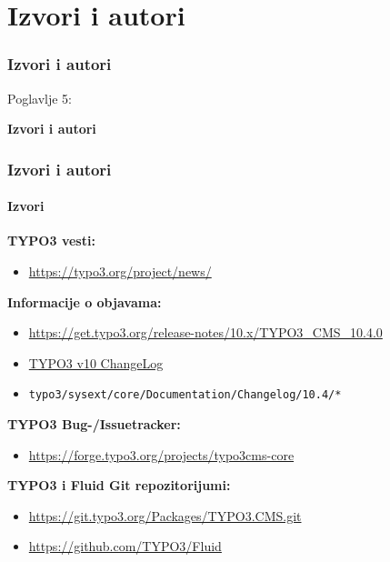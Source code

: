 %

\section{Izvori i autori}
\begin{frame}[fragile]
	\frametitle{Izvori i autori}

	\begin{center}\huge{Poglavlje 5:}\end{center}
	\begin{center}\huge{\color{typo3darkgrey}\textbf{Izvori i autori}}\end{center}

\end{frame}


\begin{frame}[fragile]
	\frametitle{Izvori i autori}
	\framesubtitle{Izvori}

	\textbf{TYPO3 vesti:}
		\begin{itemize}\smaller
			\item \url{https://typo3.org/project/news/}
		\end{itemize}

	\textbf{Informacije o objavama:}
		\begin{itemize}\smaller
			\item \url{https://get.typo3.org/release-notes/10.x/TYPO3_CMS_10.4.0}
			\item \href{https://docs.typo3.org/c/typo3/cms-core/master/en-us/Changelog-10.html}{TYPO3 v10 ChangeLog}
			\item \texttt{typo3/sysext/core/Documentation/Changelog/10.4/*}
		\end{itemize}

	\textbf{TYPO3 Bug-/Issuetracker:}
		\begin{itemize}\smaller
			\item \url{https://forge.typo3.org/projects/typo3cms-core}
		\end{itemize}

	\textbf{TYPO3 i Fluid Git repozitorijumi:}
		\begin{itemize}\smaller
			\item \url{https://git.typo3.org/Packages/TYPO3.CMS.git}
			\item \url{https://github.com/TYPO3/Fluid}
		\end{itemize}

\end{frame}


